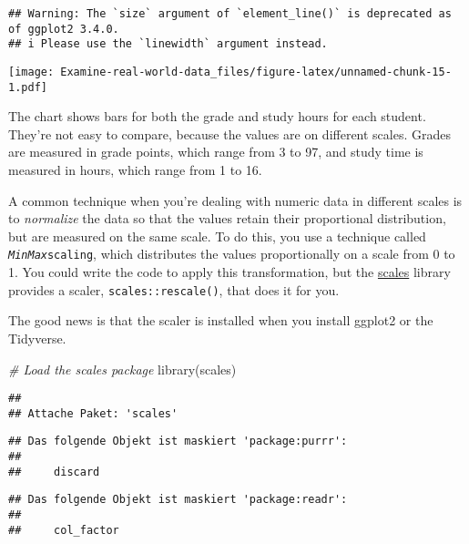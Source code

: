 \documentclass[
]{article}
\newenvironment{Shaded}{\begin{snugshade}}{\end{snugshade}}
\newcommand{\CommentTok}[1]{\textcolor[rgb]{0.56,0.35,0.01}{\textit{#1}}}
\newcommand{\FunctionTok}[1]{\textcolor[rgb]{0.00,0.00,0.00}{#1}}
\newcommand{\NormalTok}[1]{#1}
\begin{document}
\begin{verbatim}
## Warning: The `size` argument of `element_line()` is deprecated as of ggplot2 3.4.0.
## i Please use the `linewidth` argument instead.
\end{verbatim}

\texttt{[image: Examine-real-world-data\_files/figure-latex/unnamed-chunk-15-1.pdf]}

The chart shows bars for both the grade and study hours for each
student. They're not easy to compare, because the values are on
different scales. Grades are measured in grade points, which range from
3 to 97, and study time is measured in hours, which range from 1 to 16.

A common technique when you're dealing with numeric data in different
scales is to \emph{normalize} the data so that the values retain their
proportional distribution, but are measured on the same scale. To do
this, you use a technique called \emph{\texttt{MinMax}}\texttt{scaling},
which distributes the values proportionally on a scale from 0 to 1. You
could write the code to apply this transformation, but the
\href{https://scales.r-lib.org/}{scales} library provides a scaler,
\texttt{scales::rescale()}, that does it for you.

The good news is that the scaler is installed when you install ggplot2
or the Tidyverse.

\begin{Shaded}
\begin{Highlighting}[]
\CommentTok{\# Load the scales package}
\FunctionTok{library}\NormalTok{(scales)}
\end{Highlighting}
\end{Shaded}

\begin{verbatim}
## 
## Attache Paket: 'scales'
\end{verbatim}

\begin{verbatim}
## Das folgende Objekt ist maskiert 'package:purrr':
## 
##     discard
\end{verbatim}

\begin{verbatim}
## Das folgende Objekt ist maskiert 'package:readr':
## 
##     col_factor
\end{verbatim}
\end{document}
